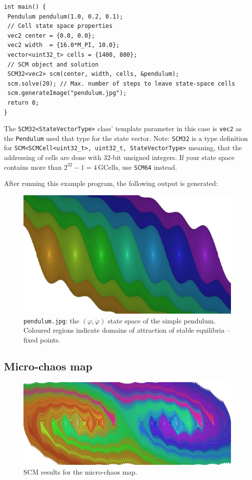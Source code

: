 \documentclass[11pt]{article}
\begin{document}
\begin{lstlisting}
int main() {
 Pendulum pendulum(1.0, 0.2, 0.1);
 // Cell state space properties
 vec2 center = {0.0, 0.0};
 vec2 width  = {16.0*M_PI, 10.0};
 vector<uint32_t> cells = {1400, 800};
 // SCM object and solution
 SCM32<vec2> scm(center, width, cells, &pendulum);
 scm.solve(20); // Max. number of steps to leave state-space cells
 scm.generateImage("pendulum.jpg");
 return 0;
}
\end{lstlisting}
The \texttt{SCM32<StateVectorType>} class' template parameter in this case is \texttt{vec2} as the \texttt{Pendulum} used that type for the state vector. Note: \texttt{SCM32} is a type definition for \texttt{SCM<SCMCell<uint32\_t>, uint32\_t, StateVectorType>} meaning, that the addressing of cells are done with 32-bit unsigned integers. If your state space contains more than $2^{32}-1 = 4\,\mathrm{GCells}$, use \texttt{SCM64} instead.

After running this example program, the following output is generated:

\begin{figure}[h]
	\centering
	\includegraphics[width=14cm]{fig/pendulum.jpg}
	\caption{\texttt{pendulum.jpg}: the $(\varphi, \dot\varphi)$ state space of the simple pendulum. Coloured regions indicate domains of attraction of stable equilibria -- fixed points.}
\end{figure}



\subsection{Micro-chaos map}

\begin{figure}[h]
	\centering
	\includegraphics[width=14cm]{fig/microchaos.jpg}
	\caption{SCM results for the micro-chaos map.}
\end{figure}
\end{document}
